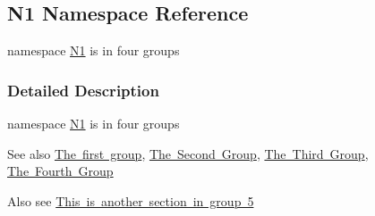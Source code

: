 \hypertarget{namespace_n1}{}\subsection{N1 Namespace Reference}
\label{namespace_n1}


namespace \mbox{\hyperlink{namespace_n1}{N1}} is in four groups  




\subsubsection{Detailed Description}
namespace \mbox{\hyperlink{namespace_n1}{N1}} is in four groups 

\begin{DoxySeeAlso}{See also}
\mbox{\hyperlink{group__group1}{The first group}}, \mbox{\hyperlink{group__group2}{The Second Group}}, \mbox{\hyperlink{group__group3}{The Third Group}}, \mbox{\hyperlink{group__group4}{The Fourth Group}}
\end{DoxySeeAlso}
Also see \mbox{\hyperlink{group__group5}{This is another section in group 5}} 